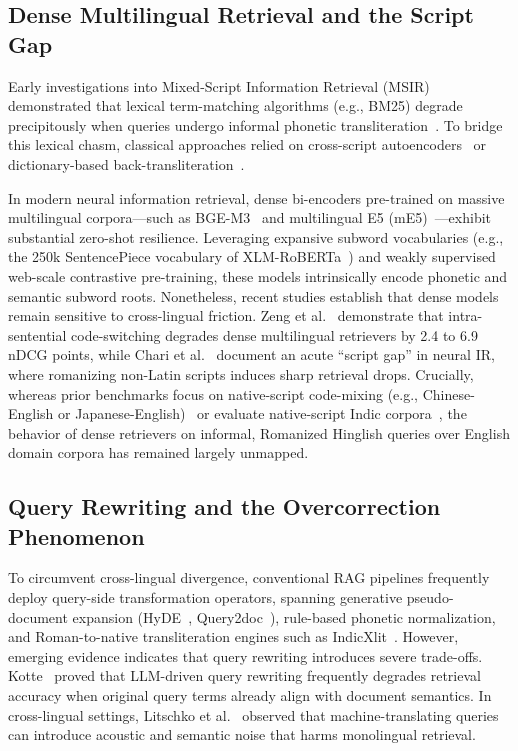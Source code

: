 \documentclass[conference]{IEEEtran}
\begin{document}
\subsection{Dense Multilingual Retrieval and the Script Gap}
Early investigations into Mixed-Script Information Retrieval (MSIR) demonstrated that lexical term-matching algorithms (e.g., BM25) degrade precipitously when queries undergo informal phonetic transliteration~\cite{gupta2014query, banerjee2016overview}. To bridge this lexical chasm, classical approaches relied on cross-script autoencoders~\cite{gupta2014query} or dictionary-based back-transliteration~\cite{banerjee2016overview}. 

In modern neural information retrieval, dense bi-encoders pre-trained on massive multilingual corpora---such as BGE-M3~\cite{chen2024bge} and multilingual E5 (mE5)~\cite{wang2024multilingual}---exhibit substantial zero-shot resilience. Leveraging expansive subword vocabularies (e.g., the 250k SentencePiece vocabulary of XLM-RoBERTa~\cite{chen2024bge}) and weakly supervised web-scale contrastive pre-training, these models intrinsically encode phonetic and semantic subword roots. Nonetheless, recent studies establish that dense models remain sensitive to cross-lingual friction. Zeng et al.~\cite{zeng2026code} demonstrate that intra-sentential code-switching degrades dense multilingual retrievers by 2.4 to 6.9 nDCG points, while Chari et al.~\cite{chari2025lost} document an acute ``script gap'' in neural IR, where romanizing non-Latin scripts induces sharp retrieval drops. Crucially, whereas prior benchmarks focus on native-script code-mixing (e.g., Chinese-English or Japanese-English)~\cite{zeng2026code, kim2025milq} or evaluate native-script Indic corpora~\cite{acharya2024hindibeir, prasanjith2025indicragsuite}, the behavior of dense retrievers on informal, Romanized Hinglish queries over English domain corpora has remained largely unmapped.

\subsection{Query Rewriting and the Overcorrection Phenomenon}
To circumvent cross-lingual divergence, conventional RAG pipelines frequently deploy query-side transformation operators, spanning generative pseudo-document expansion (HyDE~\cite{gao2023precise}, Query2doc~\cite{wang2023query2doc}), rule-based phonetic normalization, and Roman-to-native transliteration engines such as IndicXlit~\cite{madhani2023aksharantar}. However, emerging evidence indicates that query rewriting introduces severe trade-offs. Kotte~\cite{kotte2026not} proved that LLM-driven query rewriting frequently degrades retrieval accuracy when original query terms already align with document semantics. In cross-lingual settings, Litschko et al.~\cite{litschko2023boosting} observed that machine-translating queries can introduce acoustic and semantic noise that harms monolingual retrieval.
\end{document}
